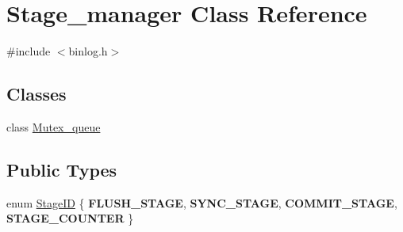 \hypertarget{classStage__manager}{}\section{Stage\+\_\+manager Class Reference}
\label{classStage__manager}


{\ttfamily \#include $<$binlog.\+h$>$}

\subsection*{Classes}
\begin{DoxyCompactItemize}
\item 
class \mbox{\hyperlink{classStage__manager_1_1Mutex__queue}{Mutex\+\_\+queue}}
\end{DoxyCompactItemize}
\subsection*{Public Types}
\begin{DoxyCompactItemize}
\item 
enum \mbox{\hyperlink{classStage__manager_a28879837525f3786d4bcb6f330f4ac69}{Stage\+ID}} \{ {\bfseries F\+L\+U\+S\+H\+\_\+\+S\+T\+A\+GE}, 
{\bfseries S\+Y\+N\+C\+\_\+\+S\+T\+A\+GE}, 
{\bfseries C\+O\+M\+M\+I\+T\+\_\+\+S\+T\+A\+GE}, 
{\bfseries S\+T\+A\+G\+E\+\_\+\+C\+O\+U\+N\+T\+ER}
 \}
\end{DoxyCompactItemize}
